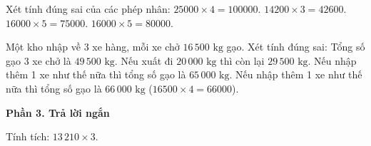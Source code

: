 \begin{ex} %
Xét tính đúng sai của các phép nhân:
\choiceTF
{\True $25000 \times 4 = 100000$.}
{\True $14200 \times 3 = 42600$.}
{$16000 \times 5 = 75000$.}
{\True $16000 \times 5 = 80000$.}
\end{ex}

\begin{ex} %
Một kho nhập về 3 xe hàng, mỗi xe chở $16\,500\text{ kg}$ gạo. Xét tính đúng sai:
\choiceTF
{\True Tổng số gạo 3 xe chở là $49\,500\text{ kg}$.}
{\True Nếu xuất đi $20\,000\text{ kg}$ thì còn lại $29\,500\text{ kg}$.}
{Nếu nhập thêm 1 xe như thế nữa thì tổng số gạo là $65\,000\text{ kg}$.}
{\True Nếu nhập thêm 1 xe như thế nữa thì tổng số gạo là $66\,000\text{ kg}$ ($16500 \times 4 = 66000$).}
\end{ex}

\textbf{Phần 3. Trả lời ngắn}

\begin{ex} %
Tính tích: $13\,210 \times 3$.
\end{ex}

